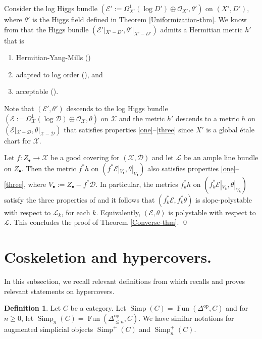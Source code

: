 \documentclass[a4paper]{amsart}
\theoremstyle{definition}
\newtheorem{definition}[theorem]{Definition}
\begin{document}
Consider the log Higgs bundle $(\mathcal{E}':=\Omega^1_{X'}(\log D')\oplus\mathcal{O}_{X'},\theta')$ on $(X',D')$, where $\theta'$ is the Higgs field defined in Theorem \ref{Uniformization-thm}. We know from \cite[Section 6.4]{dengcadorel} that the Higgs bundle $(\mathcal{E}'|_{X'-D'},\theta'|_{X'-D'})$ admits a Hermitian metric $h'$ that is 
\begin{enumerate}
\item Hermitian-Yang-Mills (\cite[Theorem 6.7]{dengcadorel})\label{one}
\item adapted to log order (\cite[Definition 5.2]{dengcadorel}), and \label{two}
\item acceptable (\cite[Definition 5.1]{dengcadorel}).\label{three}
\end{enumerate}
Note that $(\mathcal{E}',\theta')$ descends to the log Higgs bundle $(\mathcal{E}:=\Omega^1_{\mathscr{X}}(\log\mathscr{D})\oplus\mathcal{O}_\mathscr{X},\theta)$ on $\mathscr{X}$ and the metric $h'$ descends to a metric $h$ on $(\mathcal{E}|_{\mathscr{X}-\mathscr{D}},\theta|_{\mathscr{X}-\mathscr{D}})$ that satisfies properties \ref{one}--\ref{three} since $X'$ is a global \'etale chart for $\mathscr{X}$.

Let $f:Z_\bullet\to\mathscr{X}$ be a good covering for $(\mathscr{X,\mathscr{D}})$ and let $\mathcal{L}$ be an ample line bundle on $Z_\bullet$. Then the metric $f^*h$ on $(f^*\mathcal{E}|_{V_\bullet},\theta|_{V_\bullet})$ also satisfies properties \ref{one}--\ref{three}, where $V_\bullet:=Z_\bullet-f^*\mathscr{D}$. In particular, the metrics $f_k^*h$ on $(f_k^*\mathcal{E}|_{V_k},\theta|_{V_k})$ satisfy the three properties of \cite[Theorem 6.7]{dengcadorel} and it follows that $(f_k^*\mathcal{E},f_k^*\theta)$ is slope-polystable with respect to $\mathcal{L}_k$, for each $k$. Equivalently, $(\mathcal{E},\theta)$ is polystable with respect to $\mathcal{L}$. This concludes the proof of Theorem \ref{Converse-thm}. 
\qed

\appendix \section{Coskeletion and hypercovers.}
In this subsection, we recall relevant definitions from \cite{conradcohmdescent} which recalls and proves relevant statements on hypercovers.
\begin{definition}\label{defa1}
    Let $C$ be a category. Let $\operatorname{Simp}(C) = \operatorname{Fun}(\Delta^{\operatorname{op}},C)$ and for $n \ge 0$, let $\operatorname{Simp}_n(C) = \operatorname{Fun}(\Delta^{\operatorname{op}}_{\le n},C)$. We have similar notations for augmented simplicial objects $\operatorname{Simp}^{+}(C)$ and $\operatorname{Simp}^+_n(C)$.
\end{definition}
\end{document}
